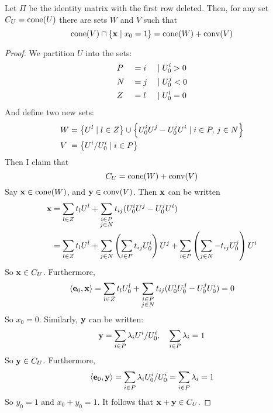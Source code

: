 \begin{Prop}\label{vcone_to_vpoly}
	Let $\Pi$ be the identity matrix with the first row deleted.  Then, for any set $C_U = \operatorname{cone}(U)$ there are sets $W$ and $V$ such that
	\[ \operatorname{cone}(V) \cap \left\{\mathbf{x}\;|\; x_0 = 1\right\} = \operatorname{cone}(W) + \operatorname{conv}(V) \]
\end{Prop}

\begin{proof}
	We partition $U$ into the sets:
	\begin{alignat*}{3}
		 & P &  & = i & \;|\; & U^i_{0} > 0 \\
		 & N &  & = j & \;|\; & U^j_{0} < 0 \\
		 & Z &  & = l & \;|\; & U^l_{0} = 0
	\end{alignat*}
	And define two new sets:
	\begin{align*}
		W   & = \left\{U^l \;|\; l \in Z\right\} \cup \left\{U^i_{0} U^j - U^j_{0} U^i \;|\; i\in P,\, j\in N\right\} \\
		V\; & = \left\{U^i/U^i_{0} \;|\; i \in P\right\}
	\end{align*}
	Then I claim that
	\[ C_U = \operatorname{cone}(W) + \operatorname{conv}(V) \]
	Say $\mathbf{x} \in\operatorname{cone}(W)$, and $\mathbf{y}\in\operatorname{conv}(V)$.  Then $\mathbf{x}$ can be written
	\begin{align*}
		\mathbf{x} & = \sum_{l\in Z}t_l U^l + \sum_{\substack{i\in P \\ j\in N}} t_{ij}(U^i_{0} U^j - U^j_{0} U^i)      \\
		   & = \sum_{l\in Z}t_l U^l + \sum_{j\in N} \left(\sum_{i\in P} t_{ij}U^i_{0}\right) U^j
		+ \sum_{i\in P} \left(\sum_{j\in N} -t_{ij}U^j_{0}\right) U^i
	\end{align*}
	So $\mathbf{x} \in C_U$.  Furthermore,
	\[ \left\langle \mathbf{e}_0, \mathbf{x} \right\rangle = \sum_{l\in Z}t_l U^l_{0} + \sum_{\substack{i\in P \\ j\in N}} t_{ij}(U^i_{0} U^j_{0} - U^j_{0} U^i_{0}) = 0\]
	So $x_0 = 0$.  Similarly, $\mathbf{y}$ can be written:
	\[ \mathbf{y} = \sum_{i\in P} \lambda_i U^i/U^i_{0},\quad\sum_{i\in P}\lambda_i = 1 \]
	So $\mathbf{y} \in C_U$.  Furthermore,
	\[ \left\langle \mathbf{e}_0, \mathbf{y} \right\rangle = \sum_{i\in P} \lambda_i U^i_{0}/U^i_{0} = \sum_{i\in P} \lambda_i  = 1\]
	So $y_0 = 1$ and $x_0 + y_0 = 1$.  It follows that $\mathbf{x} + \mathbf{y} \in C_U$.


\end{proof}
